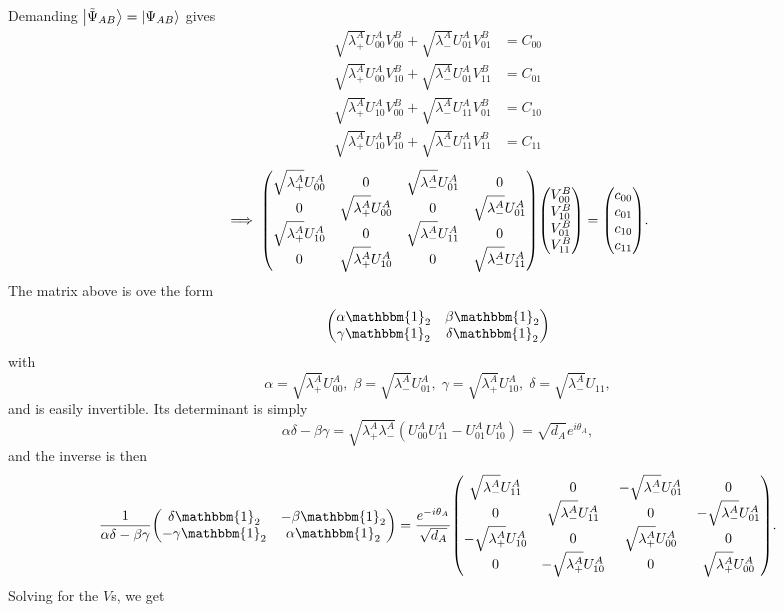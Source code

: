 \documentclass[12pt]{article}
\begin{document}
Demanding $\ket{\tilde{\Psi}_{AB}} = \ket{\Psi_{AB}}$ gives
\begin{align*}
    \sqrt{\lambda_+^A}U_{00}^AV_{00}^B + \sqrt{\lambda_-^A}U_{01}^AV_{01}^B &= C_{00} \\
    \sqrt{\lambda_+^A}U_{00}^AV_{10}^B + \sqrt{\lambda_-^A}U_{01}^AV_{11}^B &= C_{01} \\
    \sqrt{\lambda_+^A}U_{10}^AV_{00}^B + \sqrt{\lambda_-^A}U_{11}^AV_{01}^B &= C_{10} \\
    \sqrt{\lambda_+^A}U_{10}^AV_{10}^B + \sqrt{\lambda_-^A}U_{11}^AV_{11}^B &= C_{11}
\end{align*}
\[ \implies \mqty(\sqrt{\lambda_+^A}U_{00}^A & 0 & \sqrt{\lambda_-^A}U_{01}^A & 0 \\ 0 & \sqrt{\lambda_+^A}U_{00}^A & 0 & \sqrt{\lambda_-^A}U_{01}^A \\ \sqrt{\lambda_+^A}U_{10}^A & 0 & \sqrt{\lambda_-^A}U_{11}^A & 0 \\ 0 & \sqrt{\lambda_+^A}U_{10}^A & 0 & \sqrt{\lambda_-^A}U_{11}^A)\mqty(V_{00}^B \\ V_{10}^B \\ V_{01}^B \\ V_{11}^B) = \mqty(c_{00}\\c_{01}\\c_{10}\\c_{11}). \]
The matrix above is ove the form
\[ \mqty(\alpha\mathbbm{1}_2 & \beta\mathbbm{1}_2 \\ \gamma\mathbbm{1}_2 & \delta\mathbbm{1}_2) \]
with
\[ \alpha = \sqrt{\lambda_+^A}U_{00}^A,\; \beta = \sqrt{\lambda_-^A}U_{01}^A,\; \gamma = \sqrt{\lambda_+^A}U_{10}^A,\; \delta = \sqrt{\lambda_-^A}U_{11}, \]
and is easily invertible. Its determinant is simply
\[ \alpha\delta - \beta\gamma = \sqrt{\lambda_+^A\lambda_-^A}\left(U_{00}^AU_{11}^A - U_{01}^AU_{10}^A\right) = \sqrt{d_A}e^{i\theta_A}, \]
and the inverse is then
\[ \frac{1}{\alpha\delta - \beta\gamma}\mqty(\delta\mathbbm{1}_2 & -\beta\mathbbm{1}_2 \\ -\gamma\mathbbm{1}_2 & \alpha\mathbbm{1}_2) = \frac{e^{-i\theta_A}}{\sqrt{d_A}}\mqty(\sqrt{\lambda_-^A}U_{11}^A & 0 & -\sqrt{\lambda_-^A}U_{01}^A & 0 \\ 0 & \sqrt{\lambda_-^A}U_{11}^A & 0 & -\sqrt{\lambda_-^A}U_{01}^A \\ -\sqrt{\lambda_+^A}U_{10}^A & 0 & \sqrt{\lambda_+^A}U_{00}^A & 0 \\ 0 & -\sqrt{\lambda_+^A}U_{10}^A & 0 & \sqrt{\lambda_+^A}U_{00}^A). \]
Solving for the $V$s, we get
\end{document}
